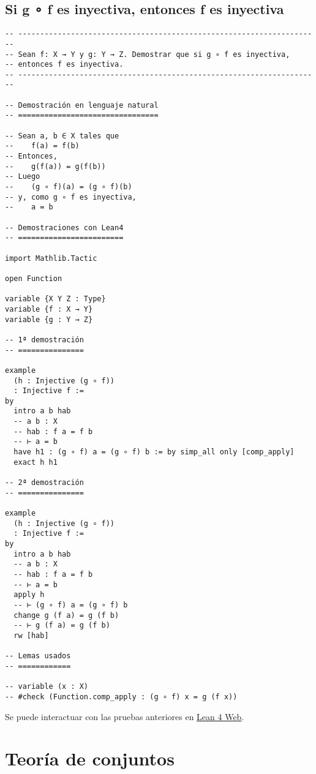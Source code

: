 \section{Si g ∘ f es inyectiva, entonces f es inyectiva}
\label{sec:org09b3cd8}
\begin{verbatim}
-- ---------------------------------------------------------------------
-- Sean f: X → Y y g: Y → Z. Demostrar que si g ∘ f es inyectiva,
-- entonces f es inyectiva.
-- ---------------------------------------------------------------------

-- Demostración en lenguaje natural
-- ================================

-- Sean a, b ∈ X tales que
--    f(a) = f(b)
-- Entonces,
--    g(f(a)) = g(f(b))
-- Luego
--    (g ∘ f)(a) = (g ∘ f)(b)
-- y, como g ∘ f es inyectiva,
--    a = b

-- Demostraciones con Lean4
-- ========================

import Mathlib.Tactic

open Function

variable {X Y Z : Type}
variable {f : X → Y}
variable {g : Y → Z}

-- 1ª demostración
-- ===============

example
  (h : Injective (g ∘ f))
  : Injective f :=
by
  intro a b hab
  -- a b : X
  -- hab : f a = f b
  -- ⊢ a = b
  have h1 : (g ∘ f) a = (g ∘ f) b := by simp_all only [comp_apply]
  exact h h1

-- 2ª demostración
-- ===============

example
  (h : Injective (g ∘ f))
  : Injective f :=
by
  intro a b hab
  -- a b : X
  -- hab : f a = f b
  -- ⊢ a = b
  apply h
  -- ⊢ (g ∘ f) a = (g ∘ f) b
  change g (f a) = g (f b)
  -- ⊢ g (f a) = g (f b)
  rw [hab]

-- Lemas usados
-- ============

-- variable (x : X)
-- #check (Function.comp_apply : (g ∘ f) x = g (f x))
\end{verbatim}
Se puede interactuar con las pruebas anteriores en \href{https://lean.math.hhu.de/\#url=https://raw.githubusercontent.com/jaalonso/Calculemus2/main/src/Inyectiva\_si\_lo\_es\_la\_composicion.lean}{Lean 4 Web}.

\chapter{Teoría de conjuntos}
\label{sec:org9fc22c2}

